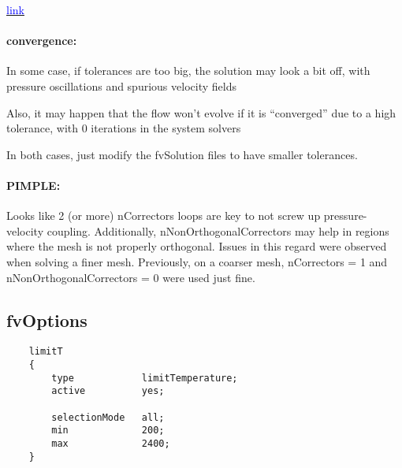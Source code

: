\documentclass[a4paper, 12pt]{article}
\numberwithin{equation}{section}
\newcommand{\code}{\fontfamily{pcr}\selectfont}
\newcommand{\blue}[1]{\textcolor{blue}{#1}}
\begin{document}
            \href{https://www.simscale.com/forum/t/cfd-pimple-algorithm/81418}{\blue{link}}

        \paragraph{convergence:\\}
            In some case, if tolerances are too big, the solution may look a bit off, with pressure oscillations and spurious velocity fields

            Also, it may happen that the flow won't evolve if it is ``converged'' due to a high tolerance, with 0 iterations in the system solvers

            In both cases, just modify the {\code fvSolution} files to have smaller tolerances.

        \paragraph{PIMPLE:\\}

            Looks like 2 (or more) {\code nCorrectors} loops are key to not screw up pressure-velocity coupling. Additionally, {\code nNonOrthogonalCorrectors} may help in regions where the mesh is not properly orthogonal. Issues in this regard were observed when solving a finer mesh. Previously, on a coarser mesh, {\code nCorrectors = 1} and {\code nNonOrthogonalCorrectors = 0} were used just fine.

    \subsection{fvOptions}

    \begin{minipage}{\textwidth}
    {
    \begin{verbatim}
    limitT
    {
        type            limitTemperature;
        active          yes;

        selectionMode   all;
        min             200;
        max             2400;
    }
    \end{verbatim}
    }
    \end{minipage}
\end{document}
